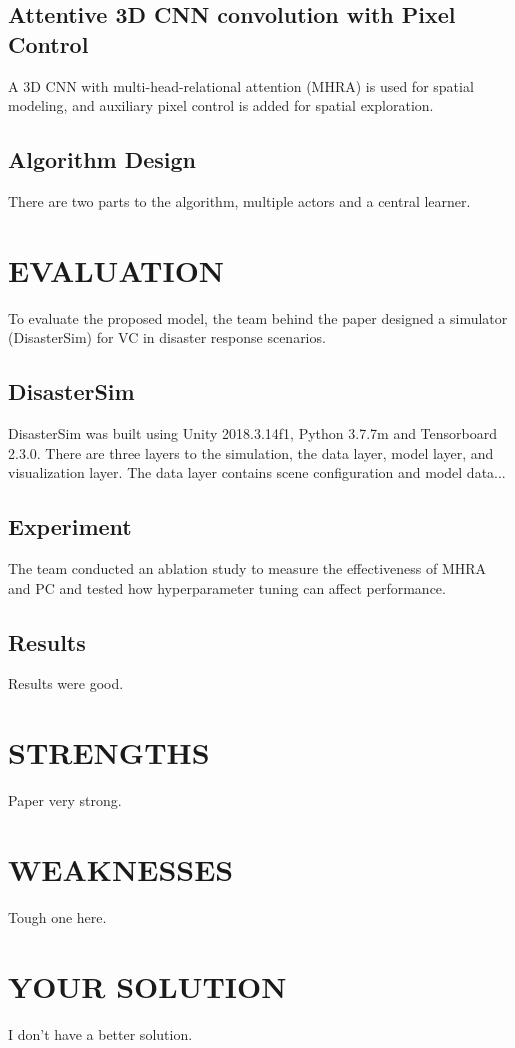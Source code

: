 \documentclass[sigconf, natbib=false]{acmart}
\begin{document}
   \subsection{Attentive 3D CNN convolution with Pixel Control}
   A 3D CNN with multi-head-relational attention (MHRA) is used for spatial modeling, and auxiliary pixel control is added for spatial exploration.
   
   \subsection{Algorithm Design}
   There are two parts to the algorithm, multiple actors and a central learner.
   
   \section{EVALUATION}
   To evaluate the proposed model, the team behind the paper designed a simulator (DisasterSim) for VC in disaster response scenarios.
   
   \subsection{DisasterSim}
   DisasterSim was built using Unity 2018.3.14f1, Python 3.7.7m and Tensorboard 2.3.0. There are three layers to the simulation, the data layer, model layer, and visualization layer. The data layer contains scene configuration and model data...
   
   \subsection{Experiment}
   The team conducted an ablation study to measure the effectiveness of MHRA and PC and tested how hyperparameter tuning can affect performance.
   
   \subsection{Results}
   Results were good.
   
   \section{STRENGTHS}
   Paper very strong.
   
   \section{WEAKNESSES}
   Tough one here.
   
   \section{YOUR SOLUTION}
   I don't have a better solution.
\end{document}
